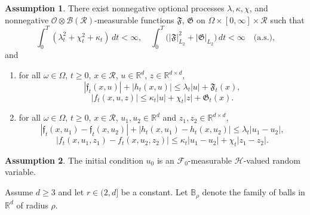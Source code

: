 \documentclass[11pt,reqno]{amsart}
\theoremstyle{definition}
\newtheorem{assumption}{Assumption}[section]
\theoremstyle{remark}
\newcommand\bR{\mathbb{R}}
\newcommand\cO{\mathcal{O}}
\newcommand\cR{\mathcal{R}}
\newcommand{\<}{\langle}
\renewcommand{\>}{\rangle}
\begin{document}
\begin{assumption} 
                                                   \label{assumption2}
There exist nonnegative optional processes
$\lambda,\kappa,\chi$, 
and nonnegative $\cO\otimes\mathcal B(\cR)$-measurable functions
$\mathfrak{F}$, $\mathfrak{G}$
on $\Omega\times[0,\infty]\times\cR$ such that
\begin{equation*}
\int_0^T(\lambda_t^2+\chi_t^2+\kappa_t)\,dt<\infty,
\quad
\int_0^T\big(|\mathfrak{F}|_{L_2}^2+|\mathfrak{G}|_{L_2}\big)\,dt<\infty
\quad \text{(a.s.),}
\end{equation*}
and 
\begin{enumerate}
\item[(i)]
for all
$\omega\in\Omega$, $t\geq0$, $x\in\cR$, $u\in\mathbb R^d$, 
$z\in\mathbb R^{d\times d}$,
\begin{equation}
                                            \label{f_upperbound}
|\mathfrak{f}_t(x,u)|+|h_t(x,u)|
\leq
\lambda_t|u|+\mathfrak{F}_t(x),
\end{equation}
$$
|f_t(x,u,z)|\leq \kappa_t|u|+\chi_t|z|+\mathfrak{G}_t(x).
$$
\item[(ii)]
for all $\omega\in\Omega$, $t\geq0$, 
$x\in\cR$, $u_1, u_2\in\bR^d$ and  
$z_1, z_2\in\bR^{d\times d}$,
\begin{equation}
                                                  \label{lipschitz1}
|\mathfrak{f}_t(x,u_1)-\mathfrak{f}_t(x,u_2)|
+
|h_t(x,u_1)-h_t(x,u_2)|
\le
\lambda_t|u_1-u_2|,
\end{equation}
\begin{equation}
                                                   \label{lipschitz2}
|f_t(x,u_1,z_1)-f_t(x,u_2,z_2)|
\le
\kappa_t|u_1-u_2|
+
\chi_t|z_1-z_2|.
\end{equation}
\end{enumerate}
\end{assumption}

\begin{assumption}
                                         \label{assumption3}
The initial condition
$u_0$
is an $\mathcal F_0$-measurable $\mathcal H$-valued random variable.
\end{assumption}

Assume $d\geq3$ and let $r\in(2,d]$ 
be a constant. Let
$\mathbb B_\rho$ 
denote the family of balls in $\mathbb R^d$ of radius $\rho$.
\end{document}
